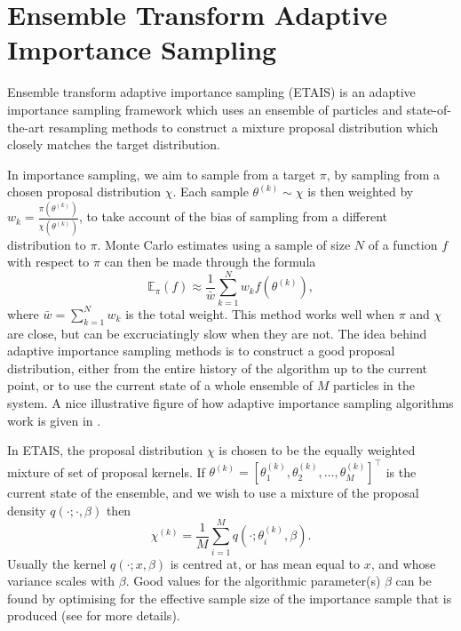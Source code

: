 \documentclass[final]{siamltex}
\newcommand{\edit}[1]{{\color{red} #1}}
\begin{document}
\section{Ensemble Transform Adaptive Importance Sampling}\label{sec:ETAIS}
Ensemble transform adaptive importance sampling
(ETAIS)\cite{cotter2015parallel} is an adaptive importance sampling framework
which uses an ensemble of particles and state-of-the-art resampling
methods to construct a mixture proposal distribution which closely
matches the target distribution. 

In importance sampling, we aim to sample from a target $\pi$, by
sampling from a chosen proposal distribution $\chi$. Each sample $\theta^{(k)} \sim \chi$ is then weighted by
$w_k = \frac{\pi(\theta^{(k)})}{\chi(\theta^{(k)})}$, to take account of the bias of
sampling from a different distribution to $\pi$. Monte Carlo estimates
using a sample of size $N$
of a function $f$ with respect to $\pi$ can then be made through the
formula
\begin{equation} \mathbb{E}_\pi(f) \approx \frac{1}{\bar{w}} \sum_{k=1}^N
  w_kf(\theta^{(k)}),\end{equation}
where $\bar{w} = \sum_{k=1}^N w_k$ is the total weight.
This method works well when $\pi$ and $\chi$ are close, but can be
excruciatingly slow when they are not. The idea behind adaptive
importance sampling methods is
to construct a good proposal distribution, either from the entire
history of the algorithm up to the current point, or to use the
current state of a whole ensemble of $M$ particles in the system.  \edit{A nice illustrative figure of how adaptive
  importance sampling algorithms work is given in \cite{bugallo2017adaptive}.}

In ETAIS, the proposal distribution $\chi$ is chosen to be the equally
weighted mixture of set of proposal kernels. If $\theta^{(k)} = [\theta_1^{(k)},
\theta_2^{(k)}, \ldots, \theta_M^{(k)}]^\top$ is the current state of the
ensemble, and we wish to use a mixture of the proposal density $q(\cdot ;
\cdot, \beta)$ then 
\begin{equation}\chi^{(k)} = \frac{1}{M} \sum_{i=1}^M q(\cdot ; \theta_i^{(k)},
\beta).\end{equation}
Usually the kernel $q(\cdot ;
x,\beta)$ is centred at, or has mean equal to $x$, and whose variance
scales with $\beta$. Good values for the
algorithmic parameter(s) $\beta$ can be
found by optimising for the effective sample size of the importance
sample that is produced (see \cite{cotter2015parallel, russ2017parallel} for more details).
\end{document}
